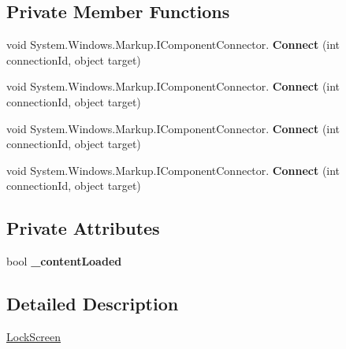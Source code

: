 \subsection*{Private Member Functions}
\begin{DoxyCompactItemize}
\item 
\mbox{\label{class_wpf_handler_1_1_u_i_1_1_controls_1_1_lock_screen_a0f64872e36d05d04de460b1a0adf7e2d}} 
void System.\+Windows.\+Markup.\+I\+Component\+Connector. {\bfseries Connect} (int connection\+Id, object target)
\item 
\mbox{\label{class_wpf_handler_1_1_u_i_1_1_controls_1_1_lock_screen_a0f64872e36d05d04de460b1a0adf7e2d}} 
void System.\+Windows.\+Markup.\+I\+Component\+Connector. {\bfseries Connect} (int connection\+Id, object target)
\item 
\mbox{\label{class_wpf_handler_1_1_u_i_1_1_controls_1_1_lock_screen_a0f64872e36d05d04de460b1a0adf7e2d}} 
void System.\+Windows.\+Markup.\+I\+Component\+Connector. {\bfseries Connect} (int connection\+Id, object target)
\item 
\mbox{\label{class_wpf_handler_1_1_u_i_1_1_controls_1_1_lock_screen_a0f64872e36d05d04de460b1a0adf7e2d}} 
void System.\+Windows.\+Markup.\+I\+Component\+Connector. {\bfseries Connect} (int connection\+Id, object target)
\end{DoxyCompactItemize}
\subsection*{Private Attributes}
\begin{DoxyCompactItemize}
\item 
\mbox{\label{class_wpf_handler_1_1_u_i_1_1_controls_1_1_lock_screen_a3e5cc93c865f07f3ce73d948bd43fb75}} 
bool {\bfseries \+\_\+content\+Loaded}
\end{DoxyCompactItemize}


\subsection{Detailed Description}
\mbox{\hyperlink{class_wpf_handler_1_1_u_i_1_1_controls_1_1_lock_screen}{Lock\+Screen}} 

